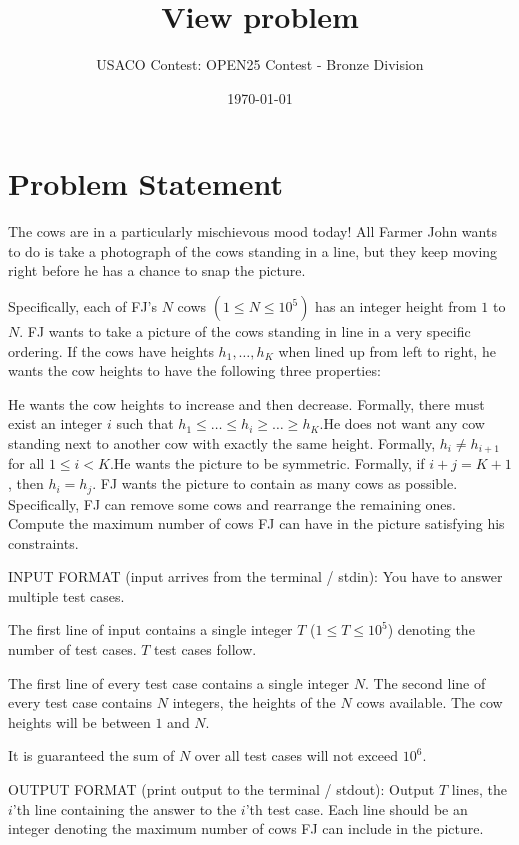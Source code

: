 \documentclass[12pt]{article}
\title{View problem}
\author{USACO Contest: OPEN25 Contest - Bronze Division}
\date{\today}
\begin{document}
\maketitle

\section*{Problem Statement}


The cows are in a particularly mischievous mood today!  All Farmer John wants to
do is take a photograph of the cows standing in a line, but they keep moving
right before he has a chance to snap the picture.

Specifically, each of FJ's $N$ cows $(1 \le N \le 10^5)$ has an integer height
from $1$ to $N$. FJ wants to take a picture of the cows standing in line in a
very specific ordering. If the cows have heights $h_1, \dots, h_K$ when lined up
from left to right, he wants the cow heights to have the following three
properties:

He wants the cow heights to increase and then decrease. Formally, there must
exist an integer $i$ such that $h_1 \le \dots \le h_i \ge \dots \ge h_K$.He does not want any cow standing next to another cow with exactly the same
height. Formally, $h_i \neq h_{i+1}$ for all $1 \le i < K$.He wants
the picture to be symmetric. Formally, if $i + j = K+1$, then $h_i = h_j$.
FJ wants the picture to contain as many cows as possible. Specifically, FJ can
remove some cows and rearrange the remaining ones. Compute the maximum number of
cows FJ can have in the picture satisfying his constraints.

INPUT FORMAT (input arrives from the terminal / stdin):
You have to answer multiple test cases.

The first line of input contains a single integer $T$ ($1 \leq T \leq 10^5$)
denoting the number of test cases. $T$ test cases follow.

The first line of every test case contains a single integer $N$. The second line
of every test case contains $N$ integers, the heights of the $N$ cows available.
The cow heights will be between $1$ and $N$.

It is guaranteed the sum of $N$ over all test cases will not exceed $10^6$.

OUTPUT FORMAT (print output to the terminal / stdout):
Output $T$ lines, the $i$'th line containing the answer to the $i$'th test case.
Each line should be an integer denoting the maximum number of cows FJ can
include in the picture.
\end{document}
